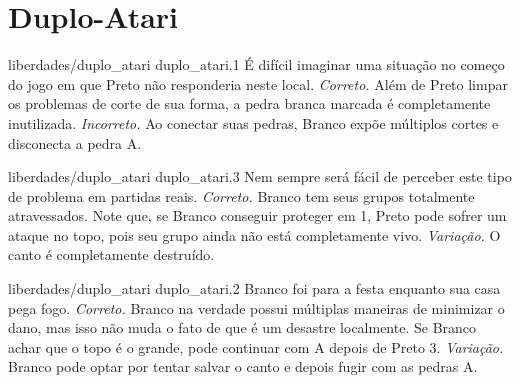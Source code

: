 \chapter{Duplo-Atari}

\emptypage

\problemAnswerDiagram
  {liberdades/duplo_atari}
  {duplo_atari.1}
  {É difícil imaginar uma situação no começo do jogo em que Preto não responderia neste local.}
  {\emph{Correto.} Além de Preto limpar os problemas de corte de sua forma, a pedra branca marcada é completamente inutilizada.}
  {\emph{Incorreto.} Ao conectar suas pedras, Branco expõe múltiplos cortes e disconecta a pedra A.}

\problemAnswerDiagram
  {liberdades/duplo_atari}
  {duplo_atari.3}
  {Nem sempre será fácil de perceber este tipo de problema em partidas reais.}
  {\emph{Correto.} Branco tem seus grupos totalmente atravessados. Note que, se Branco conseguir proteger em 1, Preto pode sofrer um ataque no topo, pois seu grupo ainda não está completamente vivo.}
  {\emph{Variação.} O canto é completamente destruído.}

\problemAnswerDiagram
  {liberdades/duplo_atari}
  {duplo_atari.2}
  {Branco foi para a festa enquanto sua casa pega fogo.}
  {\emph{Correto.} Branco na verdade possui múltiplas maneiras de minimizar o dano, mas isso não muda o fato de que é um desastre localmente. Se Branco achar que o topo é o grande, pode continuar com A depois de Preto 3.}
  {\emph{Variação.} Branco pode optar por tentar salvar o canto e depois fugir com as pedras A.}

\clearedpage
\clearedpage